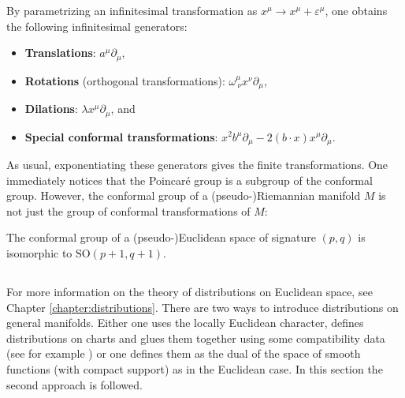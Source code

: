     By parametrizing an infinitesimal transformation as $x^\mu\rightarrow x^\mu+\varepsilon^\mu$, one obtains the following infinitesimal generators:
    \begin{itemize}
        \item\textbf{Translations}: $a^\mu\partial_\mu$,
        \item\textbf{Rotations} (orthogonal transformations): $\omega^\mu_{\ \nu}x^\nu\partial_\mu$,
        \item\textbf{Dilations}: $\lambda x^\mu\partial_\mu$, and
        \item\textbf{Special conformal transformations}: $x^2b^\mu\partial_\mu - 2(b\cdot x)x^\mu\partial_\mu$.
    \end{itemize}
    As usual, exponentiating these generators gives the finite transformations. One immediately notices that the Poincar\'e group is a subgroup of the conformal group. However, the conformal group of a (pseudo-)Riemannian manifold $M$ is not just the group of conformal transformations of $M$:
    \begin{property}\label{riemann:conformal_group}
        The conformal group of a (pseudo-)Euclidean space of signature $(p,q)$ is isomorphic to $\mathrm{SO}(p+1,q+1)$.
    \end{property}

\subsection{}

    For more information on the theory of distributions on Euclidean space, see Chapter \ref{chapter:distributions}. There are two ways to introduce distributions on general manifolds. Either one uses the locally Euclidean character, defines distributions on charts and glues them together using some compatibility data (see for example \cite{AMP1}) or one defines them as the dual of the space of smooth functions (with compact support) as in the Euclidean case. In this section the second approach is followed.

